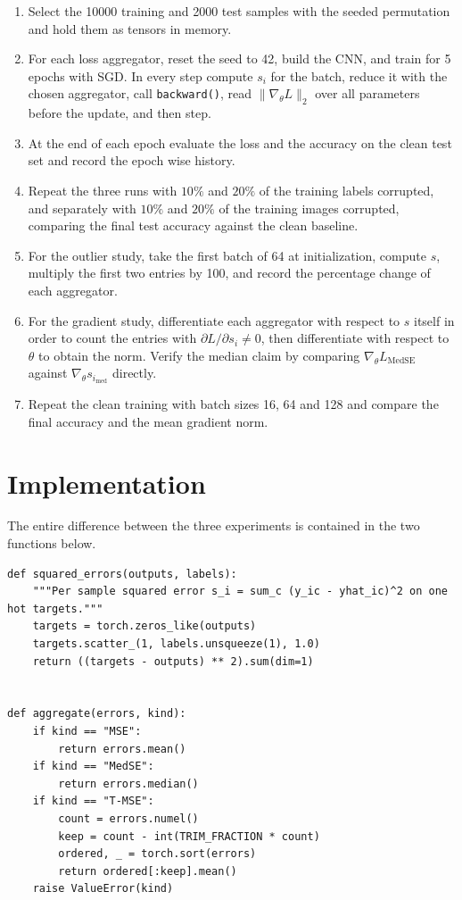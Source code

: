 \documentclass[12pt]{article}
\begin{document}
\begin{enumerate}
\item Select the 10000 training and 2000 test samples with the seeded permutation and hold them as tensors in memory.
\item For each loss aggregator, reset the seed to 42, build the CNN, and train for 5 epochs with SGD. In every step compute $s_i$ for the batch, reduce it with the chosen aggregator, call \texttt{backward()}, read $\|\nabla_\theta L\|_2$ over all parameters before the update, and then step.
\item At the end of each epoch evaluate the loss and the accuracy on the clean test set and record the epoch wise history.
\item Repeat the three runs with $10\%$ and $20\%$ of the training labels corrupted, and separately with $10\%$ and $20\%$ of the training images corrupted, comparing the final test accuracy against the clean baseline.
\item For the outlier study, take the first batch of 64 at initialization, compute $s$, multiply the first two entries by 100, and record the percentage change of each aggregator.
\item For the gradient study, differentiate each aggregator with respect to $s$ itself in order to count the entries with $\partial L/\partial s_i \neq 0$, then differentiate with respect to $\theta$ to obtain the norm. Verify the median claim by comparing $\nabla_\theta L_{\mathrm{MedSE}}$ against $\nabla_\theta s_{i_{\mathrm{med}}}$ directly.
\item Repeat the clean training with batch sizes 16, 64 and 128 and compare the final accuracy and the mean gradient norm.
\end{enumerate}

\section{Implementation}

The entire difference between the three experiments is contained in the two functions below.

\begin{lstlisting}
def squared_errors(outputs, labels):
    """Per sample squared error s_i = sum_c (y_ic - yhat_ic)^2 on one hot targets."""
    targets = torch.zeros_like(outputs)
    targets.scatter_(1, labels.unsqueeze(1), 1.0)
    return ((targets - outputs) ** 2).sum(dim=1)


def aggregate(errors, kind):
    if kind == "MSE":
        return errors.mean()
    if kind == "MedSE":
        return errors.median()
    if kind == "T-MSE":
        count = errors.numel()
        keep = count - int(TRIM_FRACTION * count)
        ordered, _ = torch.sort(errors)
        return ordered[:keep].mean()
    raise ValueError(kind)
\end{lstlisting}
\end{document}
